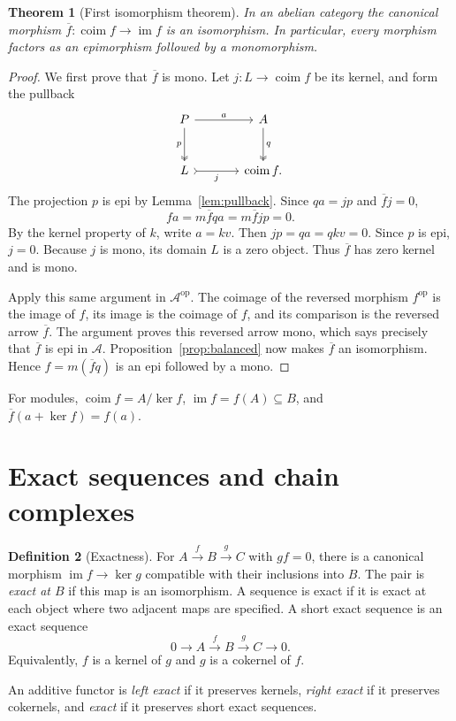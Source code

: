 \documentclass[11pt]{article}
\theoremstyle{definition}
\newtheorem{definition}{Definition}[section]
\theoremstyle{plain}
\newtheorem{theorem}[definition]{Theorem}
\newcommand{\A}{\mathcal A}
\newcommand{\im}{\operatorname{im}}
\newcommand{\coim}{\operatorname{coim}}
\newcommand{\fbar}{\overline{f}}
\begin{document}
\begin{theorem}[First isomorphism theorem]\label{thm:coimage}
In an abelian category the canonical morphism $\fbar\colon\coim f\to\im f$ is an isomorphism. In particular, every morphism factors as an epimorphism followed by a monomorphism.
\end{theorem}
\begin{proof}
We first prove that $\fbar$ is mono. Let $j\colon L\to\coim f$ be its kernel, and form the pullback
\[
\begin{tikzcd}[column sep=large,row sep=large]
P\arrow[r,"a"]\arrow[d,two heads,"p"']&A\arrow[d,two heads,"q"]\\
L\arrow[r,tail,"j"']&\coim f.
\end{tikzcd}
\]
The projection $p$ is epi by Lemma~\ref{lem:pullback}. Since $qa=jp$ and $\fbar j=0$,
\[
fa=m\fbar qa=m\fbar jp=0.
\]
By the kernel property of $k$, write $a=kv$. Then $jp=qa=qkv=0$. Since $p$ is epi, $j=0$. Because $j$ is mono, its domain $L$ is a zero object. Thus $\fbar$ has zero kernel and is mono.

Apply this same argument in $\A^{\mathrm{op}}$. The coimage of the reversed morphism $f^{\mathrm{op}}$ is the image of $f$, its image is the coimage of $f$, and its comparison is the reversed arrow $\fbar$. The argument proves this reversed arrow mono, which says precisely that $\fbar$ is epi in $\A$. Proposition~\ref{prop:balanced} now makes $\fbar$ an isomorphism. Hence $f=m(\fbar q)$ is an epi followed by a mono.
\end{proof}
For modules, $\coim f=A/\ker f$, $\im f=f(A)\subseteq B$, and $\fbar(a+\ker f)=f(a)$. 

\section{Exact sequences and chain complexes}
\begin{definition}[Exactness]
For $A\xrightarrow{f}B\xrightarrow{g}C$ with $gf=0$, there is a canonical morphism $\im f\to\ker g$ compatible with their inclusions into $B$. The pair is \emph{exact at $B$} if this map is an isomorphism. A sequence is exact if it is exact at each object where two adjacent maps are specified. A short exact sequence is an exact sequence
\[
0\longrightarrow A\xrightarrow{f}B\xrightarrow{g}C\longrightarrow0.
\]
Equivalently, $f$ is a kernel of $g$ and $g$ is a cokernel of $f$.
\end{definition}
An additive functor is \emph{left exact} if it preserves kernels, \emph{right exact} if it preserves cokernels, and \emph{exact} if it preserves short exact sequences.
\end{document}
